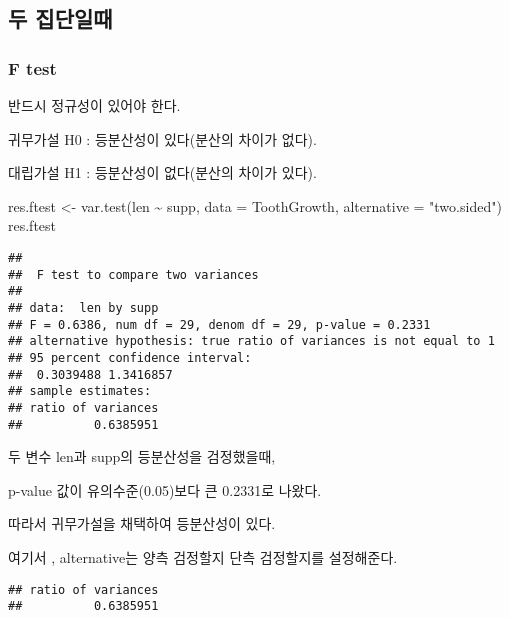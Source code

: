 \documentclass[
]{article}
\newenvironment{Shaded}{\begin{snugshade}}{\end{snugshade}}
\newcommand{\AttributeTok}[1]{\textcolor[rgb]{0.77,0.63,0.00}{#1}}
\newcommand{\FunctionTok}[1]{\textcolor[rgb]{0.00,0.00,0.00}{#1}}
\newcommand{\NormalTok}[1]{#1}
\newcommand{\OtherTok}[1]{\textcolor[rgb]{0.56,0.35,0.01}{#1}}
\newcommand{\SpecialCharTok}[1]{\textcolor[rgb]{0.00,0.00,0.00}{#1}}
\newcommand{\StringTok}[1]{\textcolor[rgb]{0.31,0.60,0.02}{#1}}
\begin{document}
\hypertarget{uxb450-uxc9d1uxb2e8uxc77cuxb54c}{%
\subsection{두 집단일때}\label{uxb450-uxc9d1uxb2e8uxc77cuxb54c}}

\hypertarget{f-test}{%
\subsubsection{F test}\label{f-test}}

반드시 정규성이 있어야 한다.

귀무가설 H0 : 등분산성이 있다(분산의 차이가 없다).

대립가설 H1 : 등분산성이 없다(분산의 차이가 있다).

\begin{Shaded}
\begin{Highlighting}[]
\NormalTok{res.ftest }\OtherTok{\textless{}{-}} \FunctionTok{var.test}\NormalTok{(len }\SpecialCharTok{\textasciitilde{}}\NormalTok{ supp, }\AttributeTok{data =}\NormalTok{ ToothGrowth, }\AttributeTok{alternative =} \StringTok{"two.sided"}\NormalTok{)}
\NormalTok{res.ftest}
\end{Highlighting}
\end{Shaded}

\begin{verbatim}
## 
##  F test to compare two variances
## 
## data:  len by supp
## F = 0.6386, num df = 29, denom df = 29, p-value = 0.2331
## alternative hypothesis: true ratio of variances is not equal to 1
## 95 percent confidence interval:
##  0.3039488 1.3416857
## sample estimates:
## ratio of variances 
##          0.6385951
\end{verbatim}

두 변수 len과 supp의 등분산성을 검정했을때,

p-value 값이 유의수준(0.05)보다 큰 0.2331로 나왔다.

따라서 귀무가설을 채택하여 등분산성이 있다.

여기서 , alternative는 양측 검정할지 단측 검정할지를 설정해준다.

\begin{Shaded}
\end{Shaded}

\begin{verbatim}
## ratio of variances 
##          0.6385951
\end{verbatim}
\end{document}
